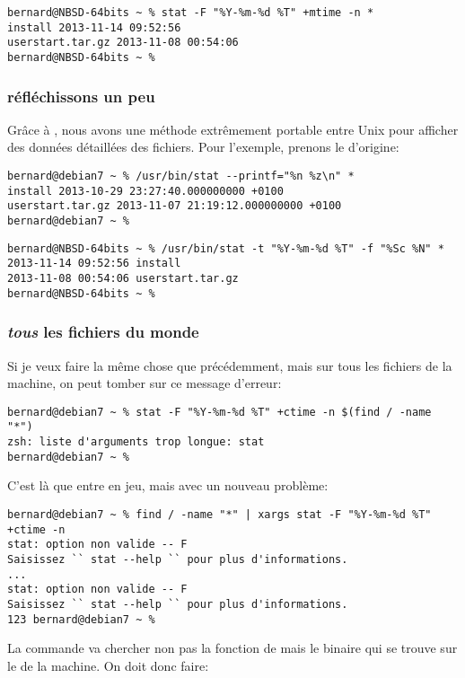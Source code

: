 \begin{lstlisting}
bernard@NBSD-64bits ~ % stat -F "%Y-%m-%d %T" +mtime -n *
install 2013-11-14 09:52:56
userstart.tar.gz 2013-11-08 00:54:06
bernard@NBSD-64bits ~ %
\end{lstlisting}

\subsubsection{réfléchissons un peu}
Grâce à \zsh{}, nous avons une méthode extrêmement portable entre Unix pour afficher des données détaillées des fichiers. Pour l'exemple, prenons le  d'origine:

\begin{lstlisting}
bernard@debian7 ~ % /usr/bin/stat --printf="%n %z\n" *
install 2013-10-29 23:27:40.000000000 +0100
userstart.tar.gz 2013-11-07 21:19:12.000000000 +0100
bernard@debian7 ~ %
\end{lstlisting}

\begin{lstlisting}
bernard@NBSD-64bits ~ % /usr/bin/stat -t "%Y-%m-%d %T" -f "%Sc %N" *
2013-11-14 09:52:56 install
2013-11-08 00:54:06 userstart.tar.gz
bernard@NBSD-64bits ~ %
\end{lstlisting}

\subsubsection{\emph{tous} les fichiers du monde}
Si je veux faire la même chose que précédemment, mais sur tous les fichiers de la machine, on peut tomber sur ce message d'erreur:

\begin{lstlisting}
bernard@debian7 ~ % stat -F "%Y-%m-%d %T" +ctime -n $(find / -name "*")
zsh: liste d'arguments trop longue: stat
bernard@debian7 ~ %
\end{lstlisting}

C'est là que  entre en jeu, mais avec un nouveau problème:

\begin{lstlisting}
bernard@debian7 ~ % find / -name "*" | xargs stat -F "%Y-%m-%d %T" +ctime -n
stat: option non valide -- F
Saisissez `` stat --help `` pour plus d'informations.
...
stat: option non valide -- F
Saisissez `` stat --help `` pour plus d'informations.
123 bernard@debian7 ~ %
\end{lstlisting}

La commande  va chercher non pas la fonction de \zsh{} mais le binaire qui se trouve sur le  de la machine. On doit donc faire:

